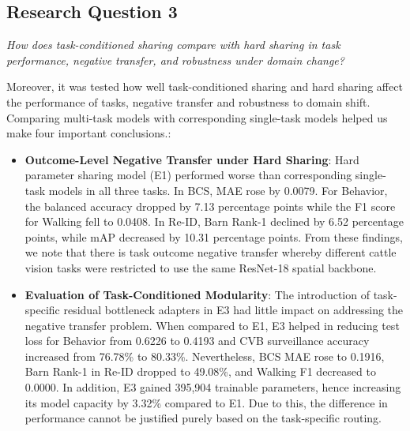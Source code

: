 \subsection{Research Question 3}
\textit{How does task-conditioned sharing compare with hard sharing in task performance, negative transfer, and robustness under domain change?}

Moreover, it was tested how well task-conditioned sharing and hard sharing affect the performance of tasks, negative transfer and robustness to domain shift. Comparing multi-task models with corresponding single-task models helped us make four important conclusions.:
\begin{itemize}
    \item \textbf{Outcome-Level Negative Transfer under Hard Sharing}: Hard parameter sharing model (E1) performed worse than corresponding single-task models in all three tasks. In BCS, MAE rose by 0.0079. For Behavior, the balanced accuracy dropped by 7.13 percentage points while the F1 score for Walking fell to 0.0408. In Re-ID, Barn Rank-1 declined by 6.52 percentage points, while mAP decreased by 10.31 percentage points. From these findings, we note that there is task outcome negative transfer whereby different cattle vision tasks were restricted to use the same ResNet-18 spatial backbone.
    \item \textbf{Evaluation of Task-Conditioned Modularity}: The introduction of task-specific residual bottleneck adapters in E3 had little impact on addressing the negative transfer problem. When compared to E1, E3 helped in reducing test loss for Behavior from 0.6226 to 0.4193 and CVB surveillance accuracy increased from 76.78\% to 80.33\%. Nevertheless, BCS MAE rose to 0.1916, Barn Rank-1 in Re-ID dropped to 49.08\%, and Walking F1 decreased to 0.0000. In addition, E3 gained 395,904 trainable parameters, hence increasing its model capacity by 3.32\% compared to E1. Due to this, the difference in performance cannot be justified purely based on the task-specific routing.

\end{itemize}

